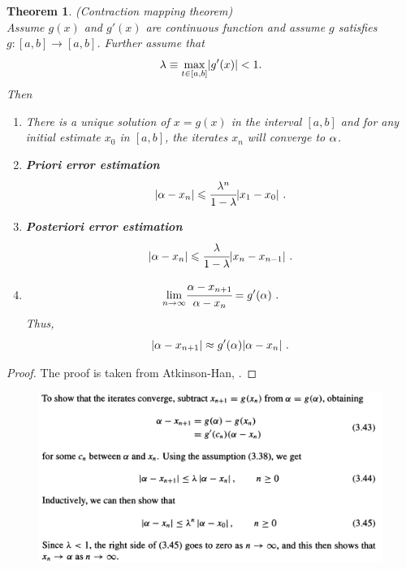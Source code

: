 \documentclass[12pt]{article}
\newtheorem{thm}{Theorem}
\theoremstyle{theorem}
\begin{document}
\begin{shaded}
\begin{thm}\label{thm1} (Contraction mapping theorem) \\
Assume $g(x)$ and $g'(x)$ are continuous function and assume $g$ satisfies $g:[a,b] \rightarrow [a,b]$. Further assume that 
%
\[  \lambda \equiv \underset{t\in [a,b]}{\max} |g'(x)| < 1. \]
%
Then
\begin{enumerate}
\item[S1.] There is a unique solution of $x = g(x)$ in the interval $[a, b]$ and for any initial estimate $x_0$ in $[a, b]$, the iterates $x_n$ will converge to $\alpha$. 
\item[S2.] \textbf{Priori error estimation}
%
\begin{equation}\label{pri}
  |\a-x_n| \leq \cfrac{\lb^n}{1-\lb} |x_1-x_0| \ . 
\end{equation}
%
\item[S3.] \textbf{Posteriori error estimation}
%
\begin{equation}\label{post}
 |\a-x_n| \leq \cfrac{\lb}{1-\lb} |x_{n}-x_{n-1}| \ .
\end{equation}
%
\item[S4.] 
%
\[ \underset{n\rightarrow \infty}{\lim} \cfrac{\alpha - x_{n+1}}{\alpha-x_n} = g'(\alpha) \ .\]
%
Thus, 
%
\begin{equation}\label{eq1}
 |\alpha - x_{n+1}| \approx g'(\alpha) |\alpha - x_{n}| \ . 
\end{equation} 
%
\end{enumerate}	
\end{thm}
\end{shaded}
\begin{proof} The proof is taken from Atkinson-Han, \cite{AtkH03}.
\end{proof}
\begin{figure}[h!]
	\centering
	\includegraphics[scale=1.1]{Figures/screenshot007}
	\label{fig:screenshot007}
	\end{figure}
	
\end{document}
